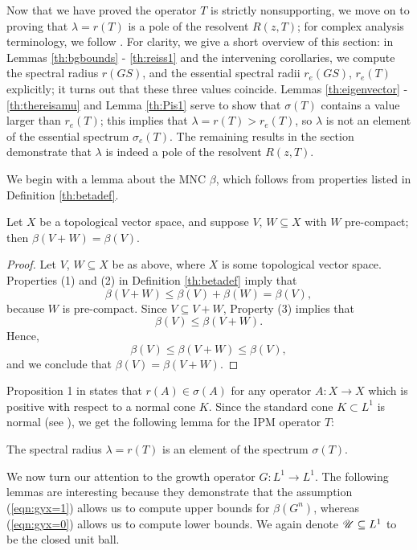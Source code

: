 Now that we have proved the operator $T$ is strictly nonsupporting, we move on to proving that $\lambda = r(T)$ is a pole of the resolvent $R(z, T)$; for complex analysis terminology, we follow  \cite{Rudin1987}. For clarity, we give a short overview of this section: in Lemmas \ref{th:bgbounds} - \ref{th:reiss1} and the intervening corollaries, we compute the spectral radius $r(GS)$, and the essential spectral radii $r_e(GS)$, $r_e(T)$ explicitly; it turns out that these three values coincide. Lemmas \ref{th:eigenvector} - \ref{th:thereisamu} and Lemma \ref{th:Pis1} serve to show that $\sigma(T)$ contains a value larger than $r_e(T)$; this implies that $\lambda = r(T) > r_e(T)$, so $\lambda$ is not an element of the essential spectrum $\sigma_e(T)$. The remaining results in the section demonstrate that $\lambda$ is indeed a pole of the resolvent $R(z, T)$.

We begin with a lemma about the MNC $\beta$, which follows from properties listed in Definition \ref{th:betadef}.

\begin{lemma}\label{th:betasum}
	Let $X$ be a topological vector space, and suppose $V$, $W \subseteq X$ with $W$ pre-compact; then $\beta(V+W) =\beta(V)$.
\end{lemma}

\begin{proof}
	Let $V$, $W \subseteq X$ be as above, where $X$ is some topological vector space.  Properties (1) and (2) in Definition \ref{th:betadef} imply that
	\[\beta(V + W) \leq \beta(V) + \beta(W) = \beta(V), \]
	because $W$ is pre-compact. Since $V \subseteq V+W$, Property (3) implies that 
	\[\beta(V) \leq \beta(V+W).\]
	Hence,
	\[\beta(V) \leq \beta(V+W) \leq \beta(V),\]
	and we conclude that $\beta(V) = \beta(V+W)$.
	
\end{proof}

Proposition 1 in \cite{Schaefer1960} states that $r(A) \in \sigma(A)$ for any operator $A:X \to X$ which is positive with respect to a normal cone $K$. Since the standard cone $K \subset L^1$ is normal (see \cite{Kras1989}), we get the following lemma for the IPM operator $T$:

\begin{lemma} \label{th:lambdainspectrum}
	The spectral radius $\lambda = r(T)$ is an element of the spectrum $\sigma(T)$.
\end{lemma}

We now turn our attention to the growth operator $G:L^1 \to L^1$. The following lemmas are interesting because they demonstrate that the assumption (\ref{eqn:gyx=1}) allows us to compute upper bounds for $\beta(G^n)$, whereas (\ref{eqn:gyx=0}) allows us to compute lower bounds. We again denote $\mathscr U \subseteq L^1$ to be the closed unit ball.

